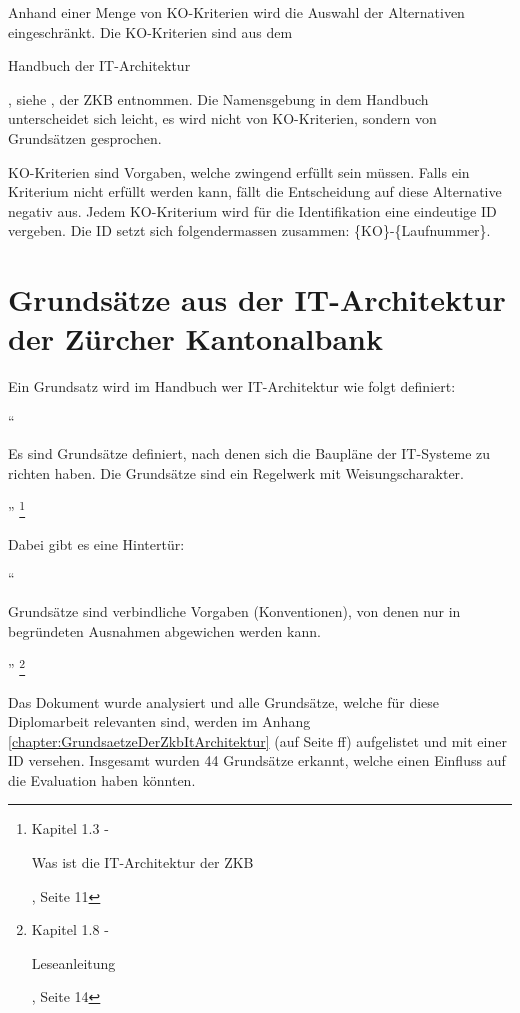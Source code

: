   Anhand einer Menge von KO-Kriterien wird die Auswahl der Alternativen
  eingeschränkt. Die KO-Kriterien sind aus dem \begin{itshape}Handbuch der
  IT-Architektur\end{itshape}, siehe \cite{ZkbHandbuchDerItArchitektur}, der
  \ac{ZKB} entnommen. Die Namensgebung in dem Handbuch unterscheidet sich
  leicht, es wird nicht von KO-Kriterien, sondern von Grundsätzen gesprochen.
  
  KO-Kriterien sind Vorgaben, welche zwingend erfüllt sein müssen. Falls ein
  Kriterium nicht erfüllt werden kann, fällt die Entscheidung auf diese
  Alternative negativ aus. Jedem KO-Kriterium wird für die Identifikation eine
  eindeutige ID vergeben. Die ID setzt sich folgendermassen zusammen: 
  \{KO\}-\{Laufnummer\}.

  \section{Grundsätze aus der IT-Architektur der Zürcher Kantonalbank}
  
  Ein Grundsatz wird im Handbuch wer IT-Architektur wie folgt definiert:
  \newline
  
  ``\begin{itshape}Es sind Grundsätze definiert, nach denen sich die Baupläne
  der IT-Systeme zu richten haben. Die Grundsätze sind ein Regelwerk mit
  Weisungscharakter.\end{itshape}''
  \footnote{\cite{ZkbHandbuchDerItArchitektur} Kapitel 1.3 - \begin{itshape}Was
  ist die IT-Architektur der ZKB\end{itshape}, Seite 11}
  \newline

  \noindent
  Dabei gibt es eine Hintertür:
  \newline

  ``\begin{itshape}Grundsätze sind verbindliche Vorgaben (Konventionen), von
  denen nur in begründeten Ausnahmen abgewichen werden kann.\end{itshape}''
  \footnote{\cite{ZkbHandbuchDerItArchitektur} Kapitel 1.8 -
  \begin{itshape}Leseanleitung\end{itshape}, Seite 14}
  \newline
  
  \noindent
  Das Dokument wurde analysiert und alle Grundsätze, welche für diese
  Diplomarbeit relevanten sind, werden im Anhang
  \ref{chapter:GrundsaetzeDerZkbItArchitektur}
   (auf Seite 
  \pageref{chapter:GrundsaetzeDerZkbItArchitektur}ff) aufgelistet und mit einer
  ID versehen. Insgesamt wurden 44 Grundsätze erkannt, welche einen Einfluss
  auf die Evaluation haben könnten.
  
